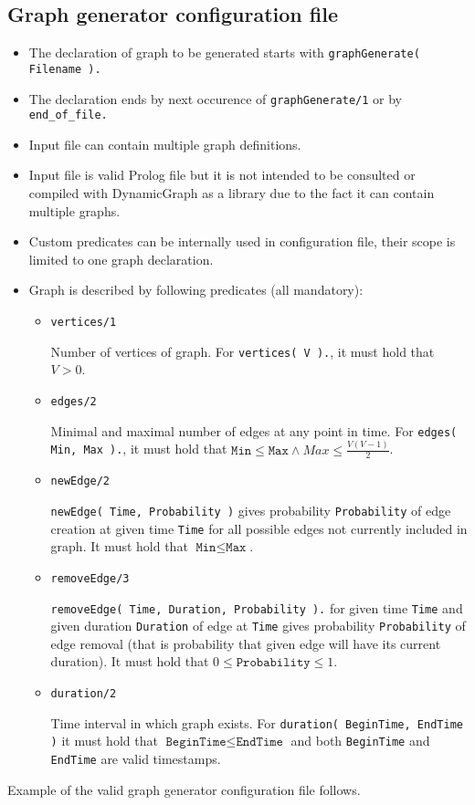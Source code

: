 \documentclass[11pt, a4paper,draft]{article}
\newcommand{\pl}[1]{\texttt{#1}} %
\theoremstyle{plain}
\theoremstyle{definition}
\theoremstyle{remark}
\begin{document}
\subsection{Graph generator configuration file}
\label{sec:files-generator}

\begin{itemize}
    \item The declaration of graph to be generated starts with \pl{graphGenerate( Filename ).}
    \item The declaration ends by next occurence of \pl{graphGenerate/1} or by
        \pl{end\_of\_file.}
    \item Input file can contain multiple graph definitions.
    \item Input file is valid Prolog file but it is not intended to be consulted or
        compiled with DynamicGraph as a library due to the fact it can contain multiple
        graphs.
    \item Custom predicates can be internally used in configuration file, their scope
        is limited to one graph declaration.
    \item Graph is described by following predicates (all mandatory): 
        \begin{itemize}
            \item \pl{vertices/1}

                Number of vertices of graph. For \pl{vertices( V ).}, it must hold that $V > 0$.
            \item \pl{edges/2}

                Minimal and maximal number of edges at any point in time.
                For \pl{edges( Min, Max ).}, it must hold that
                $\pl{Min} \le \pl{Max} \land Max \le \frac{ V(V-1)}{2}$.
            \item \pl{newEdge/2}

                \pl{newEdge( Time, Probability )} gives probability \pl{Probability} of
                edge creation at given time \pl{Time} for all possible edges not currently
                included in graph. It must hold that $\pl{Min} \le \pl{Max}$.
            \item \pl{removeEdge/3}
                
                \pl{removeEdge( Time, Duration, Probability ).} for given time \pl{Time}
                and given duration \pl{Duration} of edge at \pl{Time} gives
                probability \pl{Probability} of edge removal (that is probability
                that given edge will have its current duration).
                It must hold that $0 \le \pl{Probability} \le 1$.
            \item \pl{duration/2}

                Time interval in which graph exists. For \pl{duration( BeginTime, EndTime )}
                it must hold that  $\pl{BeginTime} \le \pl{EndTime}$ and both
                \pl{BeginTime} and \pl{EndTime} are valid timestamps.
        \end{itemize}

\end{itemize}
Example of the valid graph generator configuration file follows.
\end{document}
